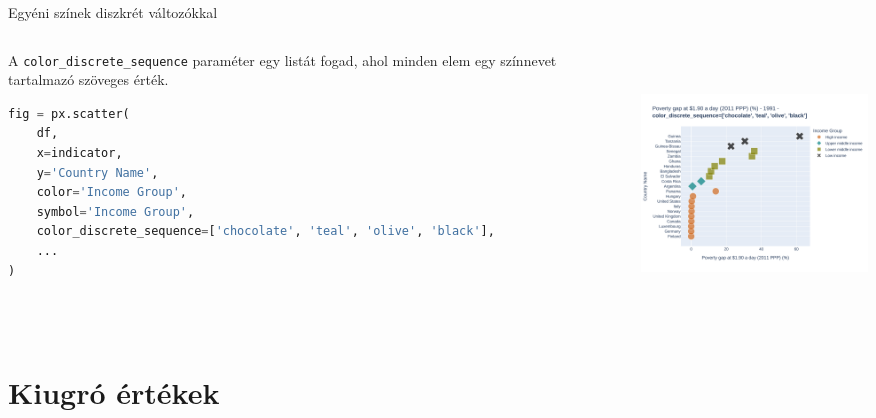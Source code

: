 \documentclass[english, aspectratio=169]{beamer}
\makeatletter
\let\origtableofcontents=\tableofcontents
\def\tableofcontents{\@ifnextchar[{\origtableofcontents}{\gobbletableofcontents}}
\def\gobbletableofcontents#1{\origtableofcontents}
\makeatother
\begin{document}
\begin{frame}[fragile]{Egyéni színek diszkrét változókkal}
	\begin{columns}
		\begin{column}{.5\textwidth}
			A \texttt{color\_discrete\_sequence} paraméter egy listát fogad, ahol minden elem egy színnevet tartalmazó szöveges érték.\par\medskip
			\begin{lstlisting}[language=python]
fig = px.scatter(
	df,
	x=indicator,
	y='Country Name',
	color='Income Group',
	symbol='Income Group',
	color_discrete_sequence=['chocolate', 'teal', 'olive', 'black'],
	...
)
			\end{lstlisting}
		\end{column}
		\begin{column}{.5\textwidth}
			\begin{center}
				\includegraphics[width=7cm, height=7cm, keepaspectratio]{images/scatter_12.png}
			\end{center}
		\end{column}
	\end{columns}
\end{frame}

\section{Kiugró értékek}

\begin{frame}{}
	\tableofcontents[currentsection]
\end{frame}
\end{document}
